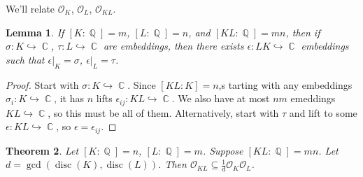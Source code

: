 \documentclass[11pt, a4paper]{memoir}
\DeclareMathOperator{\Q}{{\mathbb{Q}}}
\DeclareMathOperator{\C}{{\mathbb{C}}}
\theoremstyle{change}
\newtheorem{theorem}{Theorem}[section]
\newtheorem{lemma}[theorem]{Lemma}
\theoremstyle{plain}
\theoremstyle{nonumberplain}
\newtheorem{proof}{Proof}
\DeclareMathOperator{\disc}{disc}
\begin{document}
We'll relate $\mathcal{O}_K$, $\mathcal{O}_L$, $\mathcal{O}_{KL}$.
\begin{lemma}
    If $[K:\Q]=m$, $[L:\Q]=n$, and $[KL:\Q]=mn$, then if $\sigma:K\hookrightarrow\C$, $\tau:L\hookrightarrow\C$ are embeddings, then there exists $\epsilon:LK\hookrightarrow\C$ embeddings such that $\epsilon|_K=\sigma$, $\epsilon|_L=\tau$.
\end{lemma}
\begin{proof}
    Start with $\sigma:K\hookrightarrow\C$.
    Since $[KL:K]=n$,s tarting with any embeddings $\sigma_i:K\hookrightarrow\C$, it has $n$ lifts $\epsilon_{ij}:KL\hookrightarrow\C$.
    We also have at most $nm$ emeddings $KL\hookrightarrow\C$, so this must be all of them.
    Alternatively, start with $\tau$ and lift to some $\epsilon:KL\hookrightarrow\C$, so $\epsilon=\epsilon_{ij}$.
\end{proof}
\begin{theorem}
    Let $[K:\Q]=n$, $[L:\Q]=m$.
    Suppose $[KL:\Q]=mn$.
    Let $d=\gcd(\disc(K),\disc(L))$.
    Then $\mathcal{O}_{KL}\subseteq\frac{1}{d}\mathcal{O}_K\mathcal{O}_L$.
\end{theorem}
\end{document}
